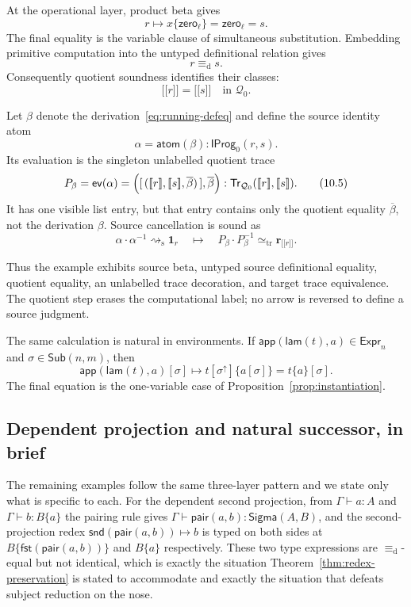 \documentclass[10pt,reqno]{amsart}
\newcommand{\Expr}{\mathsf{Expr}}
\newcommand{\Sub}{\mathsf{Sub}}
\newcommand{\SigmaTy}{\mathsf{Sigma}}
\newcommand{\Lam}{\mathsf{lam}}
\newcommand{\App}{\mathsf{app}}
\newcommand{\Pair}{\mathsf{pair}}
\newcommand{\Fst}{\mathsf{fst}}
\newcommand{\Snd}{\mathsf{snd}}
\newcommand{\Zero}{\mathsf{zero}}
\newcommand{\Tr}{\mathsf{Tr}}
\newcommand{\TrEq}{\mathrel{\simeq_{\mathrm{tr}}}}
\newcommand{\IProg}{\mathsf{IProg}}
\newcommand{\ev}{\mathsf{ev}}
\newcommand{\den}[1]{\mathopen{\lbrack\!\lbrack}#1\mathclose{\rbrack\!\rbrack}}
\newcommand{\defeq}{\mathrel{\equiv_{\mathrm d}}}
\newcommand{\red}{\mathrel{\longmapsto}}
\newcommand{\srw}{\mathrel{\rightsquigarrow_{\mathrm s}}}
\newcommand{\lift}{\uparrow}
\newcommand{\Q}{\mathcal{Q}}
\begin{document}
At the operational layer, product beta gives
\[
          r\red x\{\Zero_\ell\}=\Zero_\ell=s.
\tag{10.2}\label{eq:running-beta}
\]
The final equality is the variable clause of simultaneous substitution.
Embedding primitive computation into the untyped definitional relation gives
\[
                         r\defeq s.
\tag{10.3}\label{eq:running-defeq}
\]
Consequently quotient soundness identifies their classes:
\[
                         \den r=\den s
                          \quad\text{in }\Q_0.
\tag{10.4}\label{eq:running-quotient}
\]

Let \(\beta\) denote the derivation~\eqref{eq:running-defeq} and define the
source identity atom
\[
                   \alpha=\mathsf{atom}(\beta)
                     :\IProg_0(r,s).
\]
Its evaluation is the singleton unlabelled quotient trace
\[
 P_\beta=\ev(\alpha)
  =\Bigl(
      [\,(\den r,\den s,\overline\beta)\,],
      \overline\beta
    \Bigr)
 :\Tr_{\Q_0}(\den r,\den s).
\tag{10.5}\label{eq:running-path}
\]
It has one visible list entry, but that entry contains only the quotient
equality \(\overline\beta\), not the derivation \(\beta\).  Source
cancellation is sound as
\[
    \alpha\cdot\alpha^{-1}\srw\mathbf{1}_r
    \quad\longmapsto\quad
    P_\beta\cdot P_\beta^{-1}
        \TrEq\mathbf r_{\den r}.
\tag{10.6}\label{eq:running-rweq}
\]

Thus the example exhibits source beta, untyped source definitional equality,
quotient equality, an unlabelled trace decoration, and target trace
equivalence.  The quotient step erases the computational label; no arrow is
reversed to define a source judgment.

The same calculation is natural in environments.  If
\(\App(\Lam(t),a)\in\Expr_n\) and \(\sigma\in\Sub(n,m)\), then
\[
\App(\Lam(t),a)[\sigma]
   \red t[\sigma^\lift]\{a[\sigma]\}
   =t\{a\}[\sigma].
\]
The final equation is the one-variable case of
Proposition~\ref{prop:instantiation}.

\subsection{Dependent projection and natural successor, in brief}
\label{sec:example-snd}

The remaining examples follow the same three-layer pattern and we state only
what is specific to each.  For the dependent second projection, from
\(\Gamma\vdash a:A\) and \(\Gamma\vdash b:B\{a\}\) the pairing rule gives
\(\Gamma\vdash\Pair(a,b):\SigmaTy(A,B)\), and the second-projection redex
\(\Snd(\Pair(a,b))\red b\) is typed on both sides at \(B\{\Fst(\Pair(a,b))\}\)
and \(B\{a\}\) respectively.  These two type expressions are \(\defeq\)-equal
but not identical, which is exactly the situation
Theorem~\ref{thm:redex-preservation} is stated to accommodate and exactly the
situation that defeats subject reduction on the nose.
\end{document}
